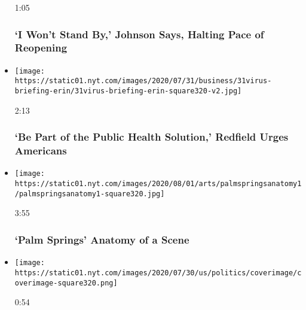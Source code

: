 \begin{itemize}
  1:05

  \hypertarget{i-wont-stand-by-johnson-says-halting-pace-of-reopening}{%
  \subsubsection{`I Won't Stand By,' Johnson Says, Halting Pace of
  Reopening}\label{i-wont-stand-by-johnson-says-halting-pace-of-reopening}}
\item
  \href{https://www.nytimes.com/video/us/politics/100000007266691/fauci-congress-testimony.html?action=click\&module=video-series-bar\&region=header\&pgtype=Article\&playlistId=video/latest-video}{}

  \texttt{[image: https://static01.nyt.com/images/2020/07/31/business/31virus-briefing-erin/31virus-briefing-erin-square320-v2.jpg]}

  2:13

  \hypertarget{be-part-of-the-public-health-solution-redfield-urges-americans}{%
  \subsubsection{`Be Part of the Public Health Solution,' Redfield Urges
  Americans}\label{be-part-of-the-public-health-solution-redfield-urges-americans}}
\item
  \href{https://www.nytimes.com/video/movies/100000007265338/palm-springs-scene.html?action=click\&module=video-series-bar\&region=header\&pgtype=Article\&playlistId=video/latest-video}{}

  \texttt{[image: https://static01.nyt.com/images/2020/08/01/arts/palmspringsanatomy1/palmspringsanatomy1-square320.jpg]}

  3:55

  \hypertarget{palm-springs--anatomy-of-a-scene}{%
  \subsubsection{`Palm Springs' \textbar{} Anatomy of a
  Scene}\label{palm-springs--anatomy-of-a-scene}}
\item
  \href{https://www.nytimes.com/video/us/politics/100000007265038/trump-inhofe-audio-call.html?action=click\&module=video-series-bar\&region=header\&pgtype=Article\&playlistId=video/latest-video}{}

  \texttt{[image: https://static01.nyt.com/images/2020/07/30/us/politics/coverimage/coverimage-square320.png]}

  0:54


\end{itemize}
